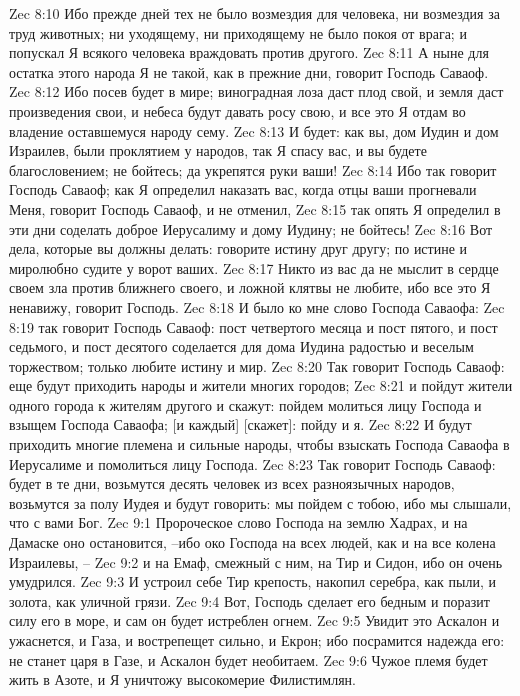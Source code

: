 Zec 8:10  Ибо прежде дней тех не было возмездия для человека, ни возмездия за труд животных; ни уходящему, ни приходящему не было покоя от врага; и попускал Я всякого человека враждовать против другого.
Zec 8:11  А ныне для остатка этого народа Я не такой, как в прежние дни, говорит Господь Саваоф.
Zec 8:12  Ибо посев будет в мире; виноградная лоза даст плод свой, и земля даст произведения свои, и небеса будут давать росу свою, и все это Я отдам во владение оставшемуся народу сему.
Zec 8:13  И будет: как вы, дом Иудин и дом Израилев, были проклятием у народов, так Я спасу вас, и вы будете благословением; не бойтесь; да укрепятся руки ваши!
Zec 8:14  Ибо так говорит Господь Саваоф; как Я определил наказать вас, когда отцы ваши прогневали Меня, говорит Господь Саваоф, и не отменил,
Zec 8:15  так опять Я определил в эти дни соделать доброе Иерусалиму и дому Иудину; не бойтесь!
Zec 8:16  Вот дела, которые вы должны делать: говорите истину друг другу; по истине и миролюбно судите у ворот ваших.
Zec 8:17  Никто из вас да не мыслит в сердце своем зла против ближнего своего, и ложной клятвы не любите, ибо все это Я ненавижу, говорит Господь.
Zec 8:18  И было ко мне слово Господа Саваофа:
Zec 8:19  так говорит Господь Саваоф: пост четвертого месяца и пост пятого, и пост седьмого, и пост десятого соделается для дома Иудина радостью и веселым торжеством; только любите истину и мир.
Zec 8:20  Так говорит Господь Саваоф: еще будут приходить народы и жители многих городов;
Zec 8:21  и пойдут жители одного города к жителям другого и скажут: пойдем молиться лицу Господа и взыщем Господа Саваофа; [и каждый] [скажет]: пойду и я.
Zec 8:22  И будут приходить многие племена и сильные народы, чтобы взыскать Господа Саваофа в Иерусалиме и помолиться лицу Господа.
Zec 8:23  Так говорит Господь Саваоф: будет в те дни, возьмутся десять человек из всех разноязычных народов, возьмутся за полу Иудея и будут говорить: мы пойдем с тобою, ибо мы слышали, что с вами Бог.
Zec 9:1  Пророческое слово Господа на землю Хадрах, и на Дамаске оно остановится, --ибо око Господа на всех людей, как и на все колена Израилевы, --
Zec 9:2  и на Емаф, смежный с ним, на Тир и Сидон, ибо он очень умудрился.
Zec 9:3  И устроил себе Тир крепость, накопил серебра, как пыли, и золота, как уличной грязи.
Zec 9:4  Вот, Господь сделает его бедным и поразит силу его в море, и сам он будет истреблен огнем.
Zec 9:5  Увидит это Аскалон и ужаснется, и Газа, и вострепещет сильно, и Екрон; ибо посрамится надежда его: не станет царя в Газе, и Аскалон будет необитаем.
Zec 9:6  Чужое племя будет жить в Азоте, и Я уничтожу высокомерие Филистимлян.
